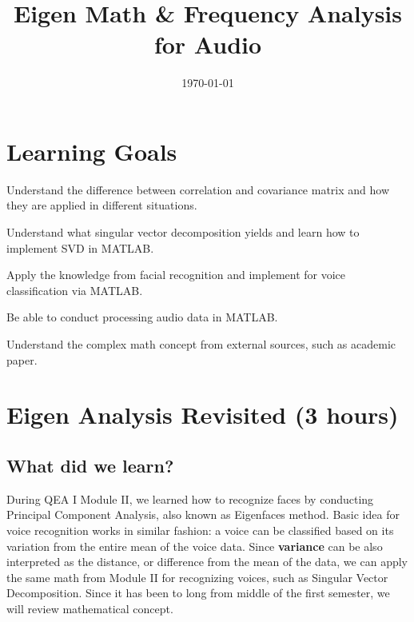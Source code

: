 \documentclass{tufte-handout}
\title{Eigen Math \& Frequency Analysis for Audio}
\author{}
\date{\today}
\begin{document}
\maketitle

\vspace{0.1in}

\section{Learning Goals}

\begin{description}[font=$\bullet$\scshape\bfseries]

\item[]Understand the difference between correlation and covariance matrix and how they are applied in different situations. 

\item[]Understand what singular vector decomposition yields and learn how to implement SVD in MATLAB.

\item[]Apply the knowledge from facial recognition and implement for voice classification via MATLAB.

\item[]Be able to conduct processing audio data in MATLAB.

\item[]Understand the complex math concept from external sources, such as academic paper.
\end{description}



\section{Eigen Analysis Revisited (3 hours)}

\subsection{What did we learn?}
During QEA I Module II, we learned how to recognize faces by conducting Principal Component Analysis, also known as Eigenfaces method. Basic idea for voice recognition works in similar fashion: a voice can be classified based on its variation from the entire mean of the voice data. Since \textbf{variance} can be also interpreted as the distance, or difference from the mean of the data, we can apply the same math from Module II for recognizing voices, such as Singular Vector Decomposition. Since it has been to long from middle of the first semester, we will review mathematical concept. 
\end{document}
